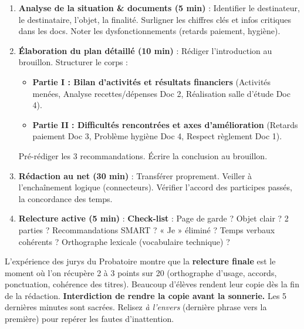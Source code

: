 \documentclass[11pt]{article}
\begin{document}
\begin{methode}
\begin{enumerate}
    \item \textbf{Analyse de la situation \& documents (5 min)} : Identifier le destinateur, le destinataire, l'objet, la finalité. Surligner les chiffres clés et infos critiques dans les docs. Noter les dysfonctionnements (retards paiement, hygiène).
    \item \textbf{Élaboration du plan détaillé (10 min)} : Rédiger l'introduction au brouillon. Structurer le corps :
    \begin{itemize}
        \item \textbf{Partie I : Bilan d'activités et résultats financiers} (Activités menées, Analyse recettes/dépenses Doc 2, Réalisation salle d'étude Doc 4).
        \item \textbf{Partie II : Difficultés rencontrées et axes d'amélioration} (Retards paiement Doc 3, Problème hygiène Doc 4, Respect règlement Doc 1).
    \end{itemize}
    Pré-rédiger les 3 recommandations. Écrire la conclusion au brouillon.
    \item \textbf{Rédaction au net (30 min)} : Transférer proprement. Veiller à l'enchaînement logique (connecteurs). Vérifier l'accord des participes passés, la concordance des temps.
    \item \textbf{Relecture active (5 min)} : \textbf{Check-list} : Page de garde ? Objet clair ? 2 parties ? Recommandations SMART ? « Je » éliminé ? Temps verbaux cohérents ? Orthographe lexicale (vocabulaire technique) ?
\end{enumerate}
\end{methode}

\begin{attention}
L'expérience des jurys du Probatoire montre que la \textbf{relecture finale} est le moment où l'on récupère 2 à 3 points sur 20 (orthographe d'usage, accords, ponctuation, cohérence des titres). Beaucoup d'élèves rendent leur copie dès la fin de la rédaction. \textbf{Interdiction de rendre la copie avant la sonnerie.} Les 5 dernières minutes sont sacrées. Relisez \emph{à l'envers} (dernière phrase vers la première) pour repérer les fautes d'inattention.
\end{attention}
\end{document}
